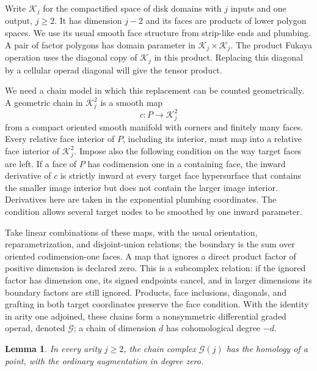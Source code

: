 \documentclass[11pt]{article}
\numberwithin{equation}{section}
\newtheorem{lemma}[theorem]{Lemma}
\theoremstyle{definition}
\theoremstyle{remark}
\begin{document}
Write $\mathcal K_j$ for the compactified space of disk domains with $j$
inputs and one output, $j\geq2$.  It has dimension $j-2$ and its
faces are products of lower polygon spaces.  We use its usual
smooth face structure from strip-like ends and plumbing.  A pair
of factor polygons has domain parameter in $\mathcal K_j\times \mathcal K_j$.
The product Fukaya operation uses the diagonal copy of $\mathcal K_j$ in
this product.  Replacing this diagonal by a cellular operad
diagonal will give the tensor product.

We need a chain model in which this replacement can be counted
geometrically.  A geometric chain in $\mathcal K_j^2$ is a smooth map
\[
 c:P\longrightarrow \mathcal K_j^2
\]
from a compact oriented smooth manifold with corners and finitely
many faces.  Every relative face interior of $P$, including its
interior, must map into a relative face interior of $\mathcal K_j^2$.
Impose also the following condition on the way target faces are
left.  If a face of $P$ has codimension one in a containing face,
the inward derivative of $c$ is strictly inward at every target
face hypersurface that contains the smaller image interior but
does not contain the larger image interior.  Derivatives here are
taken in the exponential plumbing coordinates.  The condition
allows several target nodes to be smoothed by one inward
parameter.

Take linear combinations of these maps, with the usual orientation,
reparametrization, and disjoint-union relations; the boundary is
the sum over oriented codimension-one faces.  A map that ignores
a direct product factor of positive dimension is declared zero.
This is a subcomplex relation: if the ignored factor has dimension
one, its signed endpoints cancel, and in larger dimensions its
boundary factors are still ignored.  Products, face inclusions,
diagonals, and grafting in both target coordinates preserve the
face condition.  With the identity in arity one adjoined, these
chains form a nonsymmetric differential graded operad, denoted
$\mathcal G$; a chain of dimension $d$ has cohomological degree
$-d$.

\begin{lemma}
\label{comp:chain-acyclic}
In every arity $j\geq2$, the chain complex $\mathcal G(j)$ has the
homology of a point, with the ordinary augmentation in degree zero.
\end{lemma}
\end{document}
